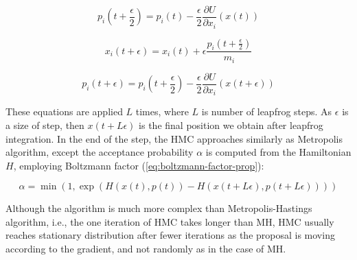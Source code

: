 \documentclass[
  digital, %
  oneside, %
  lof,     %
  lot,     %
]{fithesis4}
\begin{document}
\begin{equation}
  p_i \left(t + \frac{\epsilon}{2} \right) = p_i(t) - \frac{\epsilon}{2} \frac{\partial U}{\partial x_i} (x(t))
\end{equation}

\begin{equation}
  x_i(t + \epsilon) = x_i(t) + \epsilon \frac{p_i \left(t + \frac{\epsilon}{2} \right)}{m_i}
\end{equation}

\begin{equation}
  p_i(t + \epsilon) = p_i \left( t + \frac{\epsilon}{2} \right) - \frac{\epsilon}{2} \frac{\partial U}{\partial x_i} \left( x \left( t + \epsilon \right) \right)
\end{equation}

These equations are applied $L$ times, where $L$ is number 
of leapfrog steps. 
As $\epsilon$ is a size of step, then $x(t + L \epsilon)$ is
the final position we obtain after leapfrog integration.
In the end of the step, the HMC approaches similarly as
Metropolis algorithm, except the acceptance probability $\alpha$
is computed from the Hamiltonian $H$, employing 
Boltzmann factor (\ref{eq:boltzmann-factor-prop}):

\begin{equation}
  \alpha = \min \left( 1, \exp \left( H(x(t), p(t)) - H(x(t + L \epsilon), p(t + L \epsilon)) \right) \right)
\end{equation}






Although the algorithm is much more complex than
Metropolis-Hastings algorithm, i.e., the one iteration
of HMC takes longer than MH, HMC usually reaches stationary 
distribution after fewer iterations as the proposal is
moving according to the gradient, and not randomly as 
in the case of MH.
\end{document}
